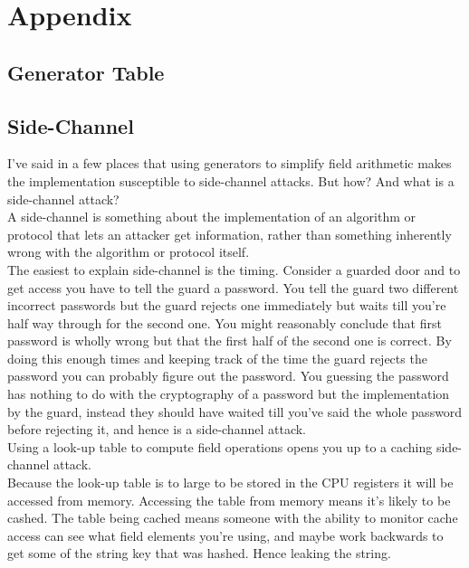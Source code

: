 
\chapter{Appendix}
\section{Generator Table}
\section{Side-Channel}
\label{appx:side-channel}
I've said in a few places that using generators to simplify field arithmetic makes the implementation susceptible to side-channel attacks.
But how?
And what is a side-channel attack?
\\

A side-channel is something about the implementation of an algorithm or protocol that lets an attacker get information,
rather than something inherently wrong with the algorithm or protocol itself. 
\\

The easiest to explain side-channel is the timing.
Consider a guarded door and to get access you have to tell the guard a password.
You tell the guard two different incorrect passwords but the guard rejects one immediately but waits till you're half way through for the second one.
You might reasonably conclude that first password is wholly wrong but that the first half of the second one is correct.
By doing this enough times and keeping track of the time the guard rejects the password you can probably figure out the password.
You guessing the password has nothing to do with the cryptography of a password but the implementation by the guard,
instead they should have waited till you've said the whole password before rejecting it, 
and hence is a side-channel attack.
\\

Using a look-up table to compute field operations opens you up to a caching side-channel attack.
\\

Because the look-up table is to large to be stored in the CPU registers it will be accessed from memory.
Accessing the table from memory means it's likely to be cashed.
The table being cached means someone with the ability to monitor cache access can see what field elements you're using,
and maybe work backwards to get some of the string key that was hashed.
Hence leaking the string.
\\

